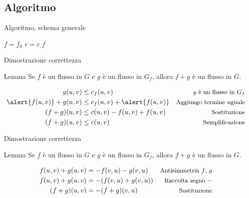 \subsection{Algoritmo}

\begin{frame}{Algoritmo, schema generale}

\begin{Procedure}
\caption[A]{$\INTARRAY[\,]$ \Flusso(\Graph $G$, \Node $s$, \Node $t$, $\INTARRAY[\,]\ c$)}
$f = f_0$
$r = c$
\Return $f$
\end{Procedure}

\end{frame}

\begin{frame}{Dimostrazione correttezza}

\begin{block}{Lemma}
Se $f$ è un flusso in $G$ e $g$ è un flusso in $G_f$, allora
$f+g$ è un flusso in $G$.
\end{block}

\bigskip
{}
\begin{align*}
g(u,v) &\leq c_f(u,v) & \textrm{\small $g$ è un flusso in $G_f$} \\
\alert{f(u,v)} + g(u,v) &\leq  c_f(u,v) + \alert{f(u,v)} & \textrm{\small Aggiungo termine uguale}\\
(f+g)(u,v) &\leq c(u,v)-f(u,v) + f(u,v) & \textrm{\small Sostituzione}\\
(f+g)(u,v) &\leq c(u,v) & \textrm{\small Semplificazione}
\end{align*}

\end{frame}

\begin{frame}{Dimostrazione correttezza}

\begin{block}{Lemma}
Se $f$ è un flusso in $G$ e $g$ è un flusso in $G_f$, allora
$f+g$ è un flusso in $G$.
\end{block}

\bigskip
{}
\begin{align*}
f(u,v)+g(u,v) &= -f(v,u)-g(v,u) & \textrm{\small Antisimmetria $f$, $g$} \\
f(u,v)+g(u,v) &= -(f(v,u) + g(v,u)) & \textrm{\small Raccolta segno $-$} \\
(f+g)(u,v) &= -(f+g)(v,u) & \textrm{\small Sostituzione} 
\end{align*}

\end{frame}

